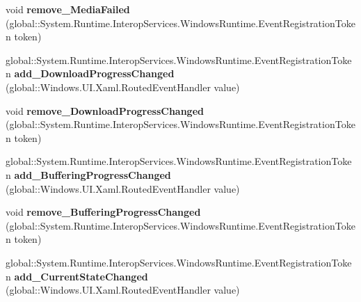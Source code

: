 \begin{DoxyCompactItemize}
void {\bfseries remove\+\_\+\+Media\+Failed} (global\+::\+System.\+Runtime.\+Interop\+Services.\+Windows\+Runtime.\+Event\+Registration\+Token token)
\item 
\mbox{\label{interface_windows_1_1_u_i_1_1_xaml_1_1_controls_1_1_i_media_element_a57e937eee241a696cb1b801e5d5d4291}} 
global\+::\+System.\+Runtime.\+Interop\+Services.\+Windows\+Runtime.\+Event\+Registration\+Token {\bfseries add\+\_\+\+Download\+Progress\+Changed} (global\+::\+Windows.\+U\+I.\+Xaml.\+Routed\+Event\+Handler value)
\item 
\mbox{\label{interface_windows_1_1_u_i_1_1_xaml_1_1_controls_1_1_i_media_element_a8aaeaafe6a46fee402a829a599d1aae3}} 
void {\bfseries remove\+\_\+\+Download\+Progress\+Changed} (global\+::\+System.\+Runtime.\+Interop\+Services.\+Windows\+Runtime.\+Event\+Registration\+Token token)
\item 
\mbox{\label{interface_windows_1_1_u_i_1_1_xaml_1_1_controls_1_1_i_media_element_a84b55fbe2bab2bbb0288457d0c16c52c}} 
global\+::\+System.\+Runtime.\+Interop\+Services.\+Windows\+Runtime.\+Event\+Registration\+Token {\bfseries add\+\_\+\+Buffering\+Progress\+Changed} (global\+::\+Windows.\+U\+I.\+Xaml.\+Routed\+Event\+Handler value)
\item 
\mbox{\label{interface_windows_1_1_u_i_1_1_xaml_1_1_controls_1_1_i_media_element_a080932b18d45c0da51366f4fe31041cf}} 
void {\bfseries remove\+\_\+\+Buffering\+Progress\+Changed} (global\+::\+System.\+Runtime.\+Interop\+Services.\+Windows\+Runtime.\+Event\+Registration\+Token token)
\item 
\mbox{\label{interface_windows_1_1_u_i_1_1_xaml_1_1_controls_1_1_i_media_element_a357521c35f1e1c53f78bf72c62939f5f}} 
global\+::\+System.\+Runtime.\+Interop\+Services.\+Windows\+Runtime.\+Event\+Registration\+Token {\bfseries add\+\_\+\+Current\+State\+Changed} (global\+::\+Windows.\+U\+I.\+Xaml.\+Routed\+Event\+Handler value)
\item 
\mbox{\label{interface_windows_1_1_u_i_1_1_xaml_1_1_controls_1_1_i_media_element_ae3f1850941fbf004a45cd333886cd5ff}} 

\end{DoxyCompactItemize}
